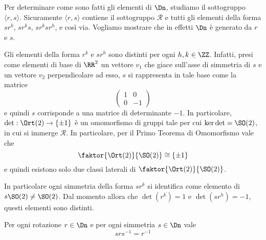 \documentclass[11pt]{scrartcl}
\begin{document}
	Per determinare come sono fatti gli elementi di $\Dn$, studiamo il sottogruppo
	$\langle r, s\rangle$. Sicuramente $\langle r, s\rangle$ contiene il sottogruppo $\mathcal{R}$
	e tutti gli elementi della forma $sr^k$, $sr^ks$, $sr^ksr^h$, e così via. Vogliamo
	mostrare che in effetti $\Dn$ è generato da $r$ e $s$.
	
	\begin{remark}
		\label{obs1.11}
		Gli elementi della forma $r^k$ e $sr^h$ sono distinti per ogni $h, k \in \ZZ$.
		Infatti, presi come elementi di base di $\RR^2$ un vettore $v_1$ che giace sull'asse
		di simmetria di $s$ e un vettore $v_2$ perpendicolare ad esso, $s$
		si rappresenta in tale base come la matrice
		\[ \begin{pmatrix}
			1 & 0 \\
			0 & -1
		\end{pmatrix} \]
		e quindi $s$ corrisponde a una matrice di determinante $-1$. In particolare,
		$\det : \Ort(2) \to \{\pm 1\}$ è un omomorfismo di gruppi tale per cui
		$\ker \det = \SO(2)$, in cui si immerge $\mathcal{R}$. In particolare, per
		il Primo Teorema di Omomorfismo vale che
		\[ \faktor{\Ort(2)}{\SO(2)} \cong \{\pm 1\} \]
		e quindi
		esistono solo due classi laterali di $\faktor{\Ort(2)}{\SO(2)}$. \medskip
		
		
		In particolare
		ogni simmetria della forma $s r^k$ si identifica come elemento di $s \SO(2) \neq \SO(2)$.
		Dal momento allora che $\det(r^k) = 1$ e $\det(sr^h) = -1$, questi elementi sono
		distinti.
	\end{remark}
	
	\begin{lemma}
		Per ogni rotazione $r \in \Dn$ e per ogni simmetria $s \in \Dn$ vale
		\[srs^{-1} = r^{-1}\]
	\end{lemma}
	
\end{document}
